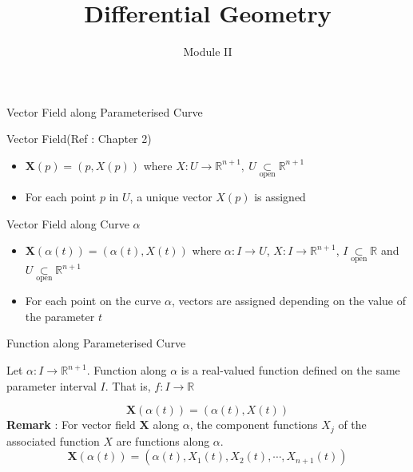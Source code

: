 \documentclass{beamer}
\title{Differential Geometry}
\author{Module II}
\institute{Chapter 7 : Geodesics \\ \textit{Straight Lines on an $n$-Surface} }
\begin{document}
\begin{frame}
\maketitle
\end{frame}

\begin{frame}{Vector Field along Parameterised Curve}
	\begin{block}{Vector Field(Ref : Chapter 2)}
\begin{itemize}
	\item $\mathbf{X}(p) = (p,X(p))$ where $X : U \to \mathbb{R}^{n+1},\ U \underset{\text{open}}{\subset} \mathbb{R}^{n+1}$
	\item For each point $p$ in $U$, a unique vector $X(p)$ is assigned
\end{itemize}
\end{block}
\begin{block}{Vector Field along Curve $\alpha$}
\begin{itemize}
	\item $\mathbf{X}(\alpha(t)) = (\alpha(t),X(t))$ where $\alpha : I \to U$, $X : I \to \mathbb{R}^{n+1}$, $I \underset{\text{open}}{\subset} \mathbb{R}$ and $U \underset{\text{open}}{\subset} \mathbb{R}^{n+1}$
	\item For each point on the curve $\alpha$, vectors are assigned depending on the value of the parameter $t$ 
\end{itemize}
\end{block}
\end{frame}

\begin{frame}{Function along Parameterised Curve}
\begin{definition}
	Let $\alpha : I \to \mathbb{R}^{n+1}$.
	Function along $\alpha$ is a real-valued function defined on the same parameter interval $I$. That is, $f : I \to \mathbb{R}$
\end{definition}
	$$\mathbf{X}(\alpha(t)) = (\alpha(t),X(t))$$
	\textbf{Remark} : For vector field $\mathbf{X}$ along $\alpha$, the component functions $X_j$ of the associated function $X$ are functions along $\alpha$.
	$$\mathbf{X}(\alpha(t)) = (\alpha(t),X_1(t),X_2(t),\cdots,X_{n+1}(t))$$
\end{frame}
\end{document}

